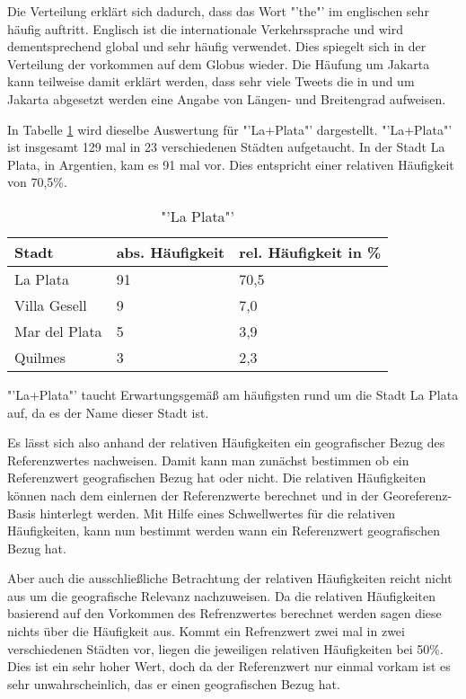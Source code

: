 				Die Verteilung erklärt sich dadurch, dass das Wort "'the"' im englischen sehr häufig auftritt.
				Englisch ist die internationale Verkehrssprache und wird dementsprechend global und sehr häufig verwendet.
				Dies spiegelt sich in der Verteilung der vorkommen auf dem Globus wieder.
				Die Häufung um Jakarta kann teilweise damit erklärt werden, dass sehr viele Tweets die in und um Jakarta abgesetzt werden eine Angabe von Längen- und Breitengrad aufweisen. 

				In Tabelle \ref{tab:laPlata} wird dieselbe Auswertung für "'La+Plata"' dargestellt. 
				"'La+Plata"' ist insgesamt 129 mal in 23 verschiedenen Städten aufgetaucht. 
				In der Stadt La Plata, in Argentien, kam es 91 mal vor.
				Dies entspricht einer relativen Häufigkeit von 70,5\%.

				\begin{table}[h]
				\centering
				\caption{"'La Plata"'}
				\label{tab:laPlata}
				\begin{tabular}{|l|l|l|}
				\hline
				Stadt            & abs. Häufigkeit & rel. Häufigkeit in \% \\ \hline \hline
				La Plata         & 91              & 70,5                      \\ \hline
				Villa Gesell     & 9               & 7,0                       \\ \hline
				Mar del Plata    & 5               & 3,9                       \\ \hline
				Quilmes          & 3               & 2,3                       \\ \hline
				\end{tabular}
				\end{table}

				"'La+Plata"' taucht Erwartungsgemäß am häufigsten rund um die Stadt La Plata auf, da es der Name dieser Stadt ist.  

				Es lässt sich also anhand der relativen Häufigkeiten ein geografischer Bezug des Referenzwertes nachweisen.
				Damit kann man zunächst bestimmen ob ein Referenzwert geografischen Bezug hat oder nicht.
				Die relativen Häufigkeiten können nach dem einlernen der Referenzwerte berechnet und in der Georeferenz-Basis hinterlegt werden.
				Mit Hilfe eines Schwellwertes für die relativen Häufigkeiten, kann nun bestimmt werden wann ein Referenzwert geografischen Bezug hat.

				Aber auch die ausschließliche Betrachtung der relativen Häufigkeiten reicht nicht aus um die geografische Relevanz nachzuweisen.
				Da die relativen Häufigkeiten basierend auf den Vorkommen des Refrenzwertes berechnet werden sagen diese nichts über die Häufigkeit aus. 
				Kommt ein Refrenzwert zwei mal in zwei verschiedenen Städten vor, liegen die jeweiligen relativen Häufigkeiten bei 50\%.
				Dies ist ein sehr hoher Wert, doch da der Referenzwert nur einmal vorkam ist es sehr unwahrscheinlich, das er einen geografischen Bezug hat.   

